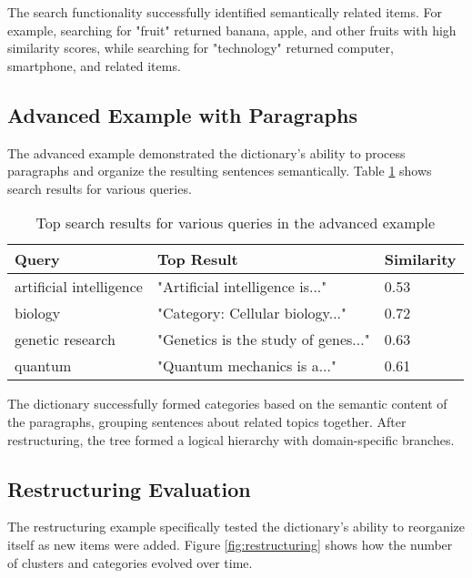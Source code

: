 \documentclass[conference]{IEEEtran}
\begin{document}
The search functionality successfully identified semantically related items. For example, searching for "fruit" returned banana, apple, and other fruits with high similarity scores, while searching for "technology" returned computer, smartphone, and related items.

\subsection{Advanced Example with Paragraphs}

The advanced example demonstrated the dictionary's ability to process paragraphs and organize the resulting sentences semantically. Table \ref{tab:paragraph_results} shows search results for various queries.

\begin{table}[ht]
\centering
\caption{Top search results for various queries in the advanced example}
\label{tab:paragraph_results}
\begin{tabular}{@{}lll@{}}
\toprule
\textbf{Query} & \textbf{Top Result} & \textbf{Similarity} \\
\midrule
artificial intelligence & "Artificial intelligence is..." & 0.53 \\
biology & "Category: Cellular biology..." & 0.72 \\
genetic research & "Genetics is the study of genes..." & 0.63 \\
quantum & "Quantum mechanics is a..." & 0.61 \\
\bottomrule
\end{tabular}
\end{table}

The dictionary successfully formed categories based on the semantic content of the paragraphs, grouping sentences about related topics together. After restructuring, the tree formed a logical hierarchy with domain-specific branches.

\subsection{Restructuring Evaluation}

The restructuring example specifically tested the dictionary's ability to reorganize itself as new items were added. Figure \ref{fig:restructuring} shows how the number of clusters and categories evolved over time.
\end{document}
